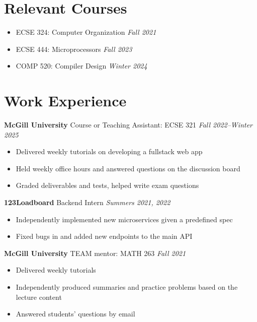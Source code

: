 \documentclass[12pt]{article}
\newenvironment{gitemize}{\begin{itemize} \color{mygrey}}{\end{itemize}}
\begin{document}
\section*{Relevant Courses}

\begin{itemize}
	\item ECSE 324: Computer Organization
	\hfill
	\textit{Fall 2021}

	\item ECSE 444: Microprocessors
	\hfill
	\textit{Fall 2023}

	\item COMP 520: Compiler Design
	\hfill
	\textit{Winter 2024}
\end{itemize}

\section*{Work Experience}

\textbf{McGill University} Course or Teaching Assistant: ECSE 321
\hfill
\textit{Fall 2022--Winter 2025}
\begin{gitemize}
	\item Delivered weekly tutorials on developing a fullstack web app
	\item Held weekly office hours and answered questions on the discussion board
	\item Graded deliverables and tests, helped write exam questions
\end{gitemize}


\textbf{123Loadboard} Backend Intern
\hfill
\textit{Summers 2021, 2022}
\begin{gitemize}
	\item Independently implemented new microservices given a predefined spec
	\item Fixed bugs in and added new endpoints to the main API
\end{gitemize}


\textbf{McGill University} TEAM mentor: MATH 263
\hfill
\textit{Fall 2021}
\begin{gitemize}
    \item Delivered weekly tutorials
    \item Independently produced summaries and practice problems based on the lecture content
    \item Answered students' questions by email
\end{gitemize}
\end{document}
